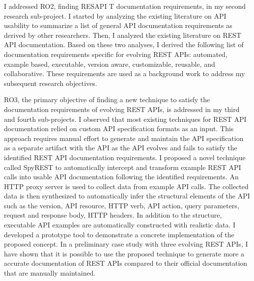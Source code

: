 \documentclass[12pt]{ucalgthes1}
\begin{document}
I addressed RO2, finding RESAPI T documentation requirements, in my second research sub-project. I started by analyzing the existing literature on API usability to summarize a list of general API documentation requirements as derived by other researchers. Then, I analyzed the existing literature on REST API documentation. Based on these two analyses, I derived the following list of documentation requirements specific for evolving REST APIs: automated, example based, executable, version aware, customizable, reusable, and collaborative. These requirements are used as a background work to address my subsequent research objectives.

RO3, the primary objective of finding a new technique to satisfy the documentation requirements of evolving REST APIs, is addressed in my third and fourth sub-projects. I observed that most existing techniques for REST API documentation relied on custom API specification formats as an input. This approach requires manual effort to generate and maintain the API specification as a separate artifact with the API as the API evolves and fails to satisfy the identified REST API documentation requirements. I proposed a novel technique called SpyREST to automatically intercept and transform example REST API calls into usable API documentation following the identified requirements. An HTTP proxy server is used to collect data from example API calls. The collected data is then synthesized to automatically infer the structural elements of the API such as the version, API resource, HTTP verb, API action, query parameters, request and response body, HTTP headers. In addition to the structure, executable API examples are automatically constructed with realistic data. I developed a prototype tool to demonstrate a concrete implementation of the proposed concept. In a preliminary case study with three evolving REST APIs, I have shown that it is possible to use the proposed technique to generate more a accurate documentation of REST APIs compared to their official documentation that are  manually maintained.
\end{document}
